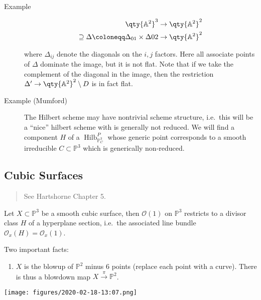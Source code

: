\begin{description}
\item[Example]
\hfill

\begin{align*} \qty{{\mathbb{A}}^2}^3 &\to \qty{{\mathbb{A}}^2}^2 \\ \supseteq \Delta\coloneqq\Delta_{01} \times\Delta{02} &\to \qty{{\mathbb{A}}^2}^2 \end{align*}

where \(\Delta_{ij}\) denote the diagonals on the \(i, j\) factors. Here
all associate points of \(\Delta\) dominate the image, but it is not
flat. Note that if we take the complement of the diagonal in the image,
then the restriction \(\Delta' \to \qty{{\mathbb{A}}^2}^2\setminus D\)
is in fact flat.
\item[Example (Mumford)]
The Hilbert scheme may have nontrivial scheme structure, i.e.~this will
be a ``nice'' hilbert scheme with is generally not reduced. We will find
a component \(H\) of a \(\operatorname{Hilb}_{{\mathbb{P}}^3_C}^P\)
whose generic point corresponds to a smooth irreducible
\(C\subset {\mathbb{P}}^3\) which is generically non-reduced.
\end{description}

\hypertarget{cubic-surfaces}{%
\subsection{Cubic Surfaces}\label{cubic-surfaces}}

\begin{quote}
See Hartshorne Chapter 5.
\end{quote}

Let \(X\subset {\mathbb{P}}^3\) be a smooth cubic surface, then
\({\mathcal{O}}(1)\) on \({\mathbb{P}}^3\) restricts to a divisor class
\(H\) of a hyperplane section, i.e.~the associated line bundle
\({\mathcal{O}}_x(H) = {\mathcal{O}}_x(1)\).

Two important facts:

\begin{enumerate}
\def\labelenumi{\arabic{enumi}.}
\tightlist
\item
  \(X\) is the blowup of \({\mathbb{P}}^2\) minus 6 points (replace each
  point with a curve). There is thus a blowdown map
  \(X \xrightarrow{\pi} {\mathbb{P}}^2\).
\end{enumerate}

\texttt{[image: figures/2020-02-18-13:07.png]}\\

